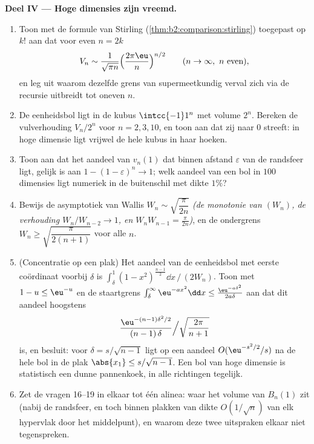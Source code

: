 \begin{problem}[{Weekendopgave --- $V_n =
\pi^{n/2}/\Gamma(\frac n2 + 1)$, en de vreemdheid van hoge
dimensies}]
\medskip
\noindent\textbf{Deel IV --- Hoge dimensies zijn vreemd.}
\begin{enumerate}[resume]
  \item Toon met de formule van Stirling
        (\cref{thm:b2:comparison:stirling}) toegepast op $k!$ aan
        dat voor even $n = 2k$
        \[
        V_n \sim \frac{1}{\sqrt{\pi n}}
        \Bigl(\frac{2\pi\eu}{n}\Bigr)^{n/2}
        \qquad (n \to \infty, \ n \text{ even}),
        \]
        en leg uit waarom dezelfde grens van supermeetkundig verval
        zich via de recursie uitbreidt tot oneven $n$.
  \item De eenheidsbol ligt in de kubus $\intcc{-1}1^n$ met volume
        $2^n$. Bereken de vulverhouding $V_n/2^n$ voor $n = 2, 3,
        10$, en toon aan dat zij naar $0$ streeft: in hoge dimensie
        ligt vrijwel de hele kubus in haar hoeken.
  \item Toon aan dat het aandeel van $v_n(1)$ dat binnen afstand
        $\varepsilon$ van de randsfeer ligt, gelijk is aan $1 - (1
        - \varepsilon)^n \to 1$; welk aandeel van een bol in $100$
        dimensies ligt numeriek in de buitenschil met dikte
        $1\%$?
  \item Bewijs de asymptotiek van Wallis $W_n \sim
        \sqrt{\dfrac{\pi}{2n}}$ \emph{(de monotonie van $(W_n)$, de
        verhouding $W_n/W_{n-2} \to 1$, en $W_nW_{n-1} =
        \frac\pi{2n}$)}, en de ondergrens $W_n \geq
        \sqrt{\dfrac{\pi}{2(n+1)}}$ voor alle $n$.
  \item (Concentratie op een plak) Het aandeel van de eenheidsbol
        met eerste coördinaat voorbij $\delta$ is $\int_\delta^1(1
        - x^2)^{\frac{n-1}2}\dd x \,\big/\, (2W_n)$. Toon met $1 -
        u \leq \eu^{-u}$ en de staartgrens $\int_\delta^\infty
        \eu^{-a x^2}\dd x \leq \frac{\eu^{-a\delta^2}}{2a\delta}$
        aan dat dit aandeel hoogstens
        \[
        \frac{\eu^{-(n-1)\delta^2/2}}{(n-1)\,\delta}
        \Big/ \sqrt{\frac{2\pi}{n+1}}
        \]
        is, en besluit: voor $\delta = s/\sqrt{n-1}$ ligt op een
        aandeel $O(\eu^{-s^2/2}/s)$ na de hele bol in de plak
        $\abs{x_1} \leq s/\sqrt{n-1}$. Een bol van hoge dimensie is
        statistisch een dunne pannenkoek, in alle richtingen
        tegelijk.
  \item Zet de vragen 16--19 in elkaar tot één alinea: waar het
        volume van $B_n(1)$ zit (nabij de randsfeer, en toch binnen
        plakken van dikte $O(1/\sqrt n)$ van elk hypervlak door het
        middelpunt), en waarom deze twee uitspraken elkaar niet
        tegenspreken.
\end{enumerate}


\end{problem}
